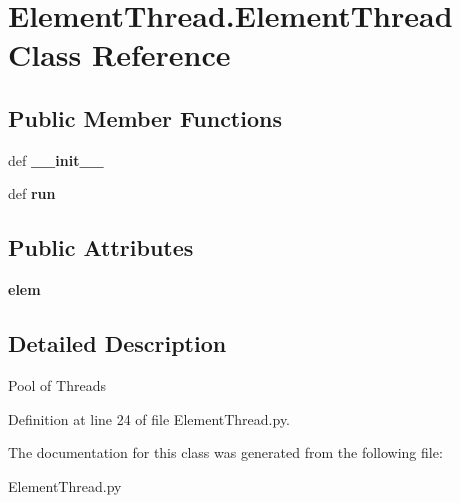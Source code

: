 \hypertarget{classElementThread_1_1ElementThread}{
\section{ElementThread.ElementThread Class Reference}
\label{classElementThread_1_1ElementThread}
}
\subsection*{Public Member Functions}
\begin{DoxyCompactItemize}
\item 
\hypertarget{classElementThread_1_1ElementThread_a5187bb7f94a5270c8f58bae314304aa0}{
def {\bfseries \_\-\_\-init\_\-\_\-}}
\label{classElementThread_1_1ElementThread_a5187bb7f94a5270c8f58bae314304aa0}

\item 
\hypertarget{classElementThread_1_1ElementThread_a6cb9235cd455f78840240d73408e52d8}{
def {\bfseries run}}
\label{classElementThread_1_1ElementThread_a6cb9235cd455f78840240d73408e52d8}

\end{DoxyCompactItemize}
\subsection*{Public Attributes}
\begin{DoxyCompactItemize}
\item 
\hypertarget{classElementThread_1_1ElementThread_a48717674c63b31a3e7a9c3f7a524f3a2}{
{\bfseries elem}}
\label{classElementThread_1_1ElementThread_a48717674c63b31a3e7a9c3f7a524f3a2}

\end{DoxyCompactItemize}


\subsection{Detailed Description}
\begin{DoxyVerb}Pool of Threads \end{DoxyVerb}
 

Definition at line 24 of file ElementThread.py.

The documentation for this class was generated from the following file:\begin{DoxyCompactItemize}
\item 
ElementThread.py\end{DoxyCompactItemize}
